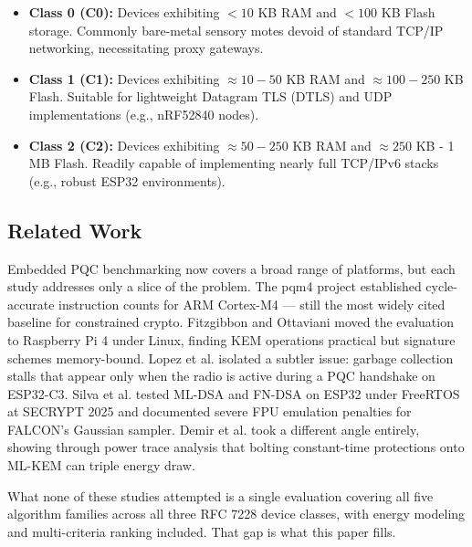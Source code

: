\begin{itemize}
 \item \textbf{Class 0 (C0):} Devices exhibiting $<10$ KB RAM and $<100$ KB Flash storage. Commonly bare-metal sensory motes devoid of standard TCP/IP networking, necessitating proxy gateways.
 \item \textbf{Class 1 (C1):} Devices exhibiting $\approx 10-50$ KB RAM and $\approx 100-250$ KB Flash. Suitable for lightweight Datagram TLS (DTLS) and UDP implementations (e.g., nRF52840 nodes).
 \item \textbf{Class 2 (C2):} Devices exhibiting $\approx 50-250$ KB RAM and $\approx 250$ KB - 1 MB Flash. Readily capable of implementing nearly full TCP/IPv6 stacks (e.g., robust ESP32 environments).
\end{itemize}

\subsection{Related Work}

Embedded PQC benchmarking now covers a broad range of platforms, but each study addresses only a slice of the problem. The pqm4 project \cite{kannwischer2019pqm4} established cycle-accurate instruction counts for ARM Cortex-M4 — still the most widely cited baseline for constrained crypto. Fitzgibbon and Ottaviani \cite{fitzgibbon2024benchmarking} moved the evaluation to Raspberry Pi 4 under Linux, finding KEM operations practical but signature schemes memory-bound. Lopez et al. \cite{lopez2025post} isolated a subtler issue: garbage collection stalls that appear only when the radio is active during a PQC handshake on ESP32-C3. Silva et al. \cite{secrypt2025esp32} tested ML-DSA and FN-DSA on ESP32 under FreeRTOS at SECRYPT 2025 and documented severe FPU emulation penalties for FALCON's Gaussian sampler. Demir et al. \cite{demir2025power} took a different angle entirely, showing through power trace analysis that bolting constant-time protections onto ML-KEM can triple energy draw.

What none of these studies attempted is a single evaluation covering all five algorithm families across all three RFC 7228 device classes, with energy modeling and multi-criteria ranking included. That gap is what this paper fills.
